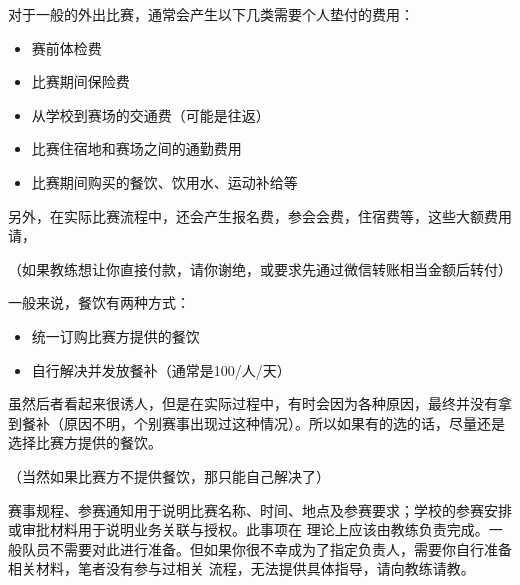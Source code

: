 \clearpage
{}
\ChapterGuide
  {
   }
  {}
  {
   }

\setlength{\parindent}{2\ccwd}

\noindent 对于一般的外出比赛，通常会产生以下几类需要个人垫付的费用：
\begin{itemize}[label=\textcolor{BookPurple}{\textbullet},itemsep=3pt,topsep=4pt]
\item 赛前体检费
\item 比赛期间保险费
\item 从学校到赛场的交通费（可能是往返）
\item 比赛住宿地和赛场之间的通勤费用
\item 比赛期间购买的餐饮、饮用水、运动补给等
\end{itemize}

\begin{SummaryBox}
另外，在实际比赛流程中，还会产生报名费，参会会费，住宿费等，这些大额费用请，

（如果教练想让你直接付款，请你谢绝，或要求先通过微信转账相当金额后转付）
\end{SummaryBox}

\begin{SummaryBox}
  一般来说，餐饮有两种方式：
\begin{itemize}[leftmargin=2\ccwd,labelsep=.6\ccwd,itemsep=5pt,topsep=4pt]
\item 统一订购比赛方提供的餐饮
\item 自行解决并发放餐补（通常是100/人/天）
\end{itemize}
虽然后者看起来很诱人，但是在实际过程中，有时会因为各种原因，最终并没有拿到餐补（原因不明，个别赛事出现过这种情况）。所以如果有的选的话，尽量还是选择比赛方提供的餐饮。

（当然如果比赛方不提供餐饮，那只能自己解决了）
\end{SummaryBox}

赛事规程、参赛通知用于说明比赛名称、时间、地点及参赛要求；学校的参赛安排或审批材料用于说明业务关联与授权。此事项在
理论上应该由教练负责完成。一般队员不需要对此进行准备。但如果你很不幸成为了指定负责人，需要你自行准备相关材料，笔者没有参与过相关
流程，无法提供具体指导，请向教练请教。
\\

